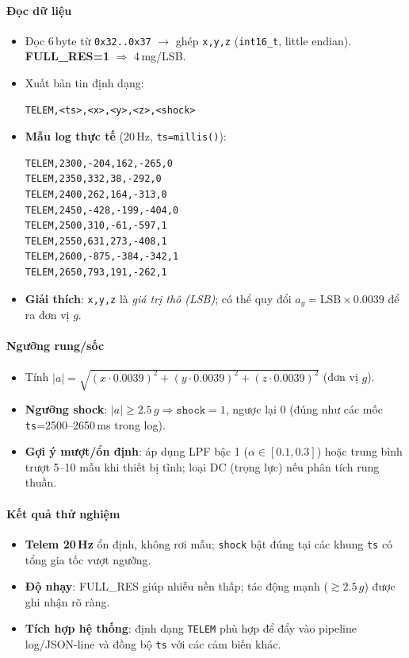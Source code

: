\paragraph{Đọc dữ liệu}
\begin{itemize}
  \item Đọc 6\,byte từ \texttt{0x32..0x37} $\rightarrow$ ghép \texttt{x,y,z} (\texttt{int16\_t}, little endian). \textbf{FULL\_RES=1} \(\Rightarrow\) 4\,mg/LSB.
  \item Xuất bản tin định dạng:
\begin{verbatim}
TELEM,<ts>,<x>,<y>,<z>,<shock>
\end{verbatim}
  \item \textbf{Mẫu log thực tế} (20\,Hz, \texttt{ts=millis()}):
\begin{verbatim}
TELEM,2300,-204,162,-265,0
TELEM,2350,332,38,-292,0
TELEM,2400,262,164,-313,0
TELEM,2450,-428,-199,-404,0
TELEM,2500,310,-61,-597,1
TELEM,2550,631,273,-408,1
TELEM,2600,-875,-384,-342,1
TELEM,2650,793,191,-262,1
\end{verbatim}
  \item \textbf{Giải thích}: \texttt{x,y,z} là \emph{giá trị thô (LSB)}; có thể quy đổi \(a_g = \text{LSB} \times 0.0039\) để ra đơn vị $g$.
\end{itemize}

\paragraph{Ngưỡng rung/sốc}
\begin{itemize}
  \item Tính \(|a|=\sqrt{(x\cdot0.0039)^2+(y\cdot0.0039)^2+(z\cdot0.0039)^2}\) (đơn vị $g$).
  \item \textbf{Ngưỡng shock}: \(|a|\ge 2.5\,g \Rightarrow \texttt{shock}=1\), ngược lại 0 (đúng như các mốc \texttt{ts}=2500–2650\,ms trong log).
  \item \textbf{Gợi ý mượt/ổn định}: áp dụng LPF bậc 1 (\(\alpha\in[0.1,0.3]\)) hoặc trung bình trượt 5–10 mẫu khi thiết bị tĩnh; loại DC (trọng lực) nếu phân tích rung thuần.
\end{itemize}

\paragraph{Kết quả thử nghiệm}
\begin{itemize}
  \item \textbf{Telem 20\,Hz} ổn định, không rơi mẫu; \texttt{shock} bật đúng tại các khung \texttt{ts} có tổng gia tốc vượt ngưỡng.
  \item \textbf{Độ nhạy}: FULL\_RES giúp nhiễu nền thấp; tác động mạnh (\(\gtrsim 2.5\,g\)) được ghi nhận rõ ràng.
  \item \textbf{Tích hợp hệ thống}: định dạng \texttt{TELEM} phù hợp để đẩy vào pipeline log/JSON-line và đồng bộ \texttt{ts} với các cảm biến khác.
\end{itemize}

